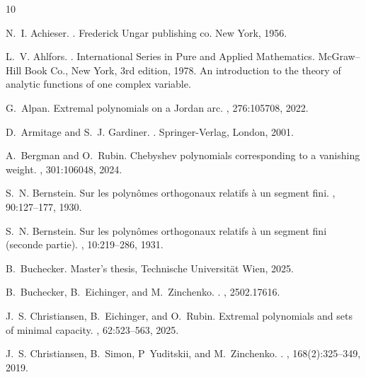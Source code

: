 \documentclass[12pt,oneside,reqno]{amsart}
\theoremstyle{definition}
\numberwithin{equation}{section}
\begin{document}
\begin{thebibliography}{10}

N.~I. Achieser.
.
\newblock Frederick Ungar publishing co. New York, 1956.

L.~V. Ahlfors.
.
\newblock International Series in Pure and Applied Mathematics. McGraw--Hill Book Co., New York, 3rd edition, 1978.
\newblock An introduction to the theory of analytic functions of one complex variable.

G.~Alpan.
\newblock Extremal polynomials on a {J}ordan arc.
, 276:105708, 2022.

D.~Armitage and S.~J. Gardiner.
.
\newblock Springer-Verlag, London, 2001.

A.~Bergman and O.~Rubin.
\newblock Chebyshev polynomials corresponding to a vanishing weight.
, 301:106048, 2024.

S.~N. Bernstein.
\newblock Sur les polyn\^{o}mes orthogonaux relatifs \`{a} un segment fini.
, 90:127--177, 1930.

S.~N. Bernstein.
\newblock Sur les polyn\^{o}mes orthogonaux relatifs \`{a} un segment fini (seconde partie).
, 10:219--286, 1931.

B.~Buchecker.
\newblock Master's thesis,  Technische Universit\"{a}t Wien, 2025.

B.~Buchecker, B.~Eichinger, and M.~Zinchenko.
.
, 2502.17616.

J.~S. Christiansen, B.~Eichinger, and O.~Rubin.
\newblock Extremal polynomials and sets of minimal capacity.
, 62:523--563, 2025.

J.~S. Christiansen, B.~Simon, P~Yuditskii, and M.~Zinchenko.
.
, 168(2):325--349, 2019.


\end{thebibliography}
\end{document}
